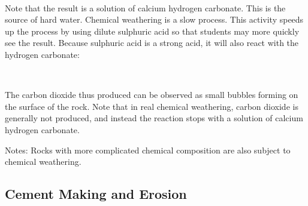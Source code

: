 \begin{multicols}{2}
\begin{description*}
{\begin{center}
\\	
\end{center}

Note that the result is a solution of calcium hydrogen carbonate. This is the source of hard water.
Chemical weathering is a slow process. This activity speeds up the process by using dilute sulphuric acid so that students may more quickly see the result. Because sulphuric acid is a strong acid, it will also react with the hydrogen carbonate:\\
\begin{center}
\\	
\end{center}
The carbon dioxide thus produced can be observed as small bubbles forming on the surface of the rock. Note that in real chemical weathering, carbon dioxide is generally not produced, and instead the reaction stops with a solution of calcium hydrogen carbonate.}
\item[Notes:]{Rocks with more complicated chemical composition are also subject to chemical weathering.}
\end{description*}

\vfill
\columnbreak

\subsection{Cement Making and Erosion}



\end{multicols}
